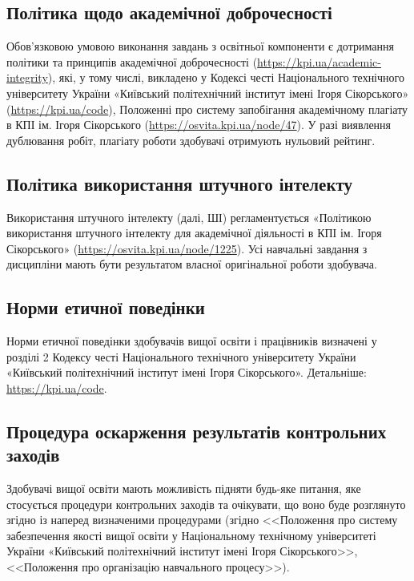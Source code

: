 \documentclass{Syllabus}
\begin{document}
\subsection*{Політика щодо академічної доброчесності}

Обов’язковою умовою виконання завдань з освітньої компоненти є дотримання політики та принципів академічної доброчесності (\url{https://kpi.ua/academic-integrity}), які, у тому числі, викладено у Кодексі честі Національного технічного університету України «Київський політехнічний інститут імені Ігоря Сікорського» (\url{https://kpi.ua/code}), Положенні про систему запобігання академічному плагіату в КПІ ім. Ігоря Сікорського (\url{https://osvita.kpi.ua/node/47}). У разі виявлення дублювання робіт, плагіату роботи здобувачі отримують нульовий рейтинг.

\subsection*{Політика використання штучного інтелекту}

Використання штучного інтелекту (далі, ШІ) регламентується «Політикою використання штучного інтелекту для академічної діяльності в КПІ ім. Ігоря Сікорського» (\url{https://osvita.kpi.ua/node/1225}). Усі навчальні завдання з дисципліни мають бути результатом власної оригінальної роботи здобувача.

\subsection*{Норми етичної поведінки}

Норми етичної поведінки здобувачів вищої освіти і працівників визначені у розділі 2 Кодексу честі Національного технічного університету України «Київський політехнічний інститут імені Ігоря Сікорського». Детальніше: \url{https://kpi.ua/code}.

\subsection*{Процедура оскарження результатів контрольних заходів}

Здобувачі вищої освіти мають можливість підняти будь-яке питання, яке стосується процедури контрольних заходів та очікувати, що воно буде розглянуто згідно із наперед визначеними процедурами (згідно <<Положення про систему забезпечення якості вищої освіти у Національному технічному університеті України «Київський політехнічний інститут імені Ігоря Сікорського>>, <<Положення про організацію навчального процесу>>).
\end{document}
